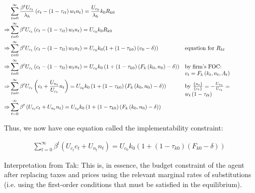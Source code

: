 \documentclass[10pt]{article}
\begin{document}
\begin{align}
    &\sum_{t=0}^{\infty} \frac{\beta^t U_{c_t}}{\lambda_h} \left(c_t-\left(1-\tau_{\ell t}\right) w_t n_t\right)=\frac{U_{c_0}}{\lambda_h} k_0 R_{k 0} \\
    \Rightarrow &\sum_{t=0}^{\infty} \beta^t U_{c_t}\left(c_t-\left(1-\tau_{\ell t}\right) w_t n_t\right)=U_{c_0} k_0 R_{k 0} \\
    \Rightarrow &\sum_{t=0}^{\infty} \beta^t U_{c_t}\left(c_t-\left(1-\tau_{\ell t}\right) w_t n_t\right)=U_{c_0} k_0 (1+\left(1-\tau_{k 0}\right)\left(v_0-\delta\right)) && \parbox[t]{4cm}{\raggedright equation for $R_{k t}$} \\
    \Rightarrow &\sum_{t=0}^{\infty} \beta^t U_{c_t}\left(c_t-\left(1-\tau_{\ell t}\right) w_t n_t\right)=U_{c_0} k_0 \left(1+\left(1-\tau_{k 0}\right)\left(F_k\left(k_0, n_0\right)-\delta\right)\right) && \parbox[t]{4cm}{\raggedright by firm's FOC: $v_t=F_k\left(k_t, n_t, A_t\right)$} \\
    \Rightarrow &\sum_{t=0}^{\infty} \beta^t U_{c_t}\left(c_t+\frac{U_{n_t}}{U_{c_t}} n_t\right) =U_{c_0} k_0 \left(1+\left(1-\tau_{k 0}\right)\left(F_k\left(k_0, n_0\right)-\delta\right)\right) && \parbox[t]{4cm}{\raggedright by $\frac{\{n_t\}}{\{c_t\}} = -\frac{U_{n_t}}{U_{c_t}}=w_t\left(1-\tau_{\ell t}\right)$} \\
    \Rightarrow &\sum_{t=0}^{\infty} \beta^t\left(U_{c_t} c_t+U_{n_t} n_t\right)=U_{c_0} k_0 \left(1+\left(1-\tau_{k 0}\right)\left(F_k\left(k_0, n_0\right)-\delta\right)\right)
\end{align}

Thus, we now have one equation called the 
implementability constraint:

\begin{align}
    \sum_{t=0}^{\infty} \beta^t\left(U_{c_t} c_t+U_{n_t} n_t\right)=U_{c_0} k_0\left(1+\left(1-\tau_{k 0}\right)\left(F_{k 0}-\delta\right)\right)
\end{align}

Interpretation from Tak:
This is, in essence, the budget constraint of the agent after replacing taxes and prices using the relevant marginal rates of substitutions (i.e. using the first-order conditions that must be satisfied in the equilibrium).
\end{document}
